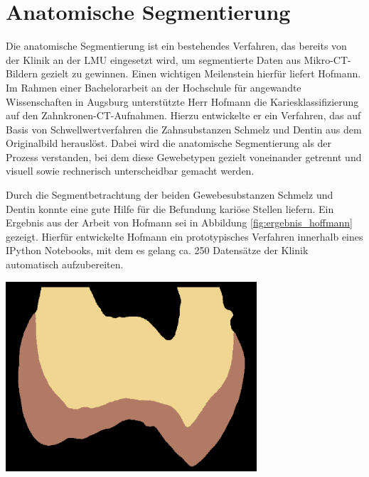 \chapter{Anatomische Segmentierung}
\label{chap:theoretische_grundlagen} Die anatomische Segmentierung ist ein bestehendes
Verfahren, das bereits von der Klinik an der LMU eingesetzt wird, um segmentierte
Daten aus Mikro-\ac{CT}-Bildern gezielt zu gewinnen. Einen wichtigen Meilenstein
hierfür liefert Hofmann. Im Rahmen einer Bachelorarbeit an der Hochschule für
angewandte Wissenschaften in Augsburg unterstützte Herr Hofmann die
Kariesklassifizierung auf den Zahnkronen-\ac{CT}-Aufnahmen. Hierzu entwickelte
er ein Verfahren, das auf Basis von Schwellwertverfahren die Zahnsubstanzen Schmelz
und Dentin aus dem Originalbild herauslöst. Dabei wird die anatomische
Segmentierung als der Prozess verstanden, bei dem diese Gewebetypen gezielt voneinander
getrennt und visuell sowie rechnerisch unterscheidbar gemacht werden.

\begin{minipage}{0.40\textwidth}
	Durch die Segmentbetrachtung der beiden Gewebesubstanzen Schmelz und Dentin konnte
	\citet[S.~41]{hoffmann2020} eine gute Hilfe für die Befundung kariöse Stellen
	liefern. Ein Ergebnis aus der Arbeit von Hofmann sei in Abbildung \ref{fig:ergebnis_hoffmann}
	gezeigt. Hierfür entwickelte Hofmann ein prototypisches Verfahren innerhalb
	eines IPython Notebooks, mit dem es gelang ca. 250 Datensätze der Klinik
	automatisch aufzubereiten.
\end{minipage}
\hfill
\begin{minipage}{0.50\textwidth}
	\centering
	\includegraphics[width=0.7\textwidth]{img/ergebnis_hoffmann_2.jpg}
	 \label{fig:ergebnis_hoffmann}
\end{minipage}

